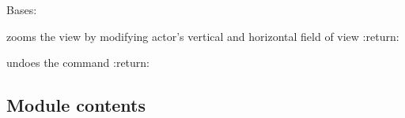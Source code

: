\documentclass[letterpaper,10pt,english]{sphinxmanual}
\begin{document}
\begin{fulllineitems}
\label{\detokenize{commands:commands.ZoomCommand.ZoomCommand}}
\pysigstartsignatures
{}
\pysigstopsignatures
\sphinxAtStartPar
Bases: {\hyperref[\detokenize{commands:commands.Command.Command}]{}}

\begin{fulllineitems}
\label{\detokenize{commands:commands.ZoomCommand.ZoomCommand.execute}}
\pysigstartsignatures
{}
\pysigstopsignatures
\sphinxAtStartPar
zooms the view by modifying actor’s vertical and horizontal field of view
:return:

\end{fulllineitems}


\begin{fulllineitems}
\label{\detokenize{commands:commands.ZoomCommand.ZoomCommand.undo}}
\pysigstartsignatures
{}
\pysigstopsignatures
\sphinxAtStartPar
undoes the command
:return:

\end{fulllineitems}


\end{fulllineitems}



\subsection{Module contents}
\label{\detokenize{commands:module-commands}}\label{\detokenize{commands:module-contents}}
\sphinxstepscope
\end{document}

